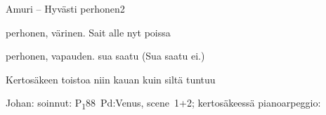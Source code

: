 \documentclass[11pt,a4paper]{article}
\begin{document}
\begin{mysong}{Amuri – Hyvästi perhonen}{2}

\begin{SBChorus}
   perhonen,  värinen. Sait  alle
   nyt poissa 

   perhonen,  vapauden.
   sua saatu  (Sua saatu ei.)

  {\SBLyricNoteFont Kertosäkeen toistoa niin kauan kuin siltä tuntuu}
        
    
\end{SBChorus}


{\SBLyricNoteFont Johan: soinnut: P\textsubscript{1}88~Pd:Venus, scene~1+2;
kertosäkeessä pianoarpeggio:}


\end{mysong}
\end{document}
